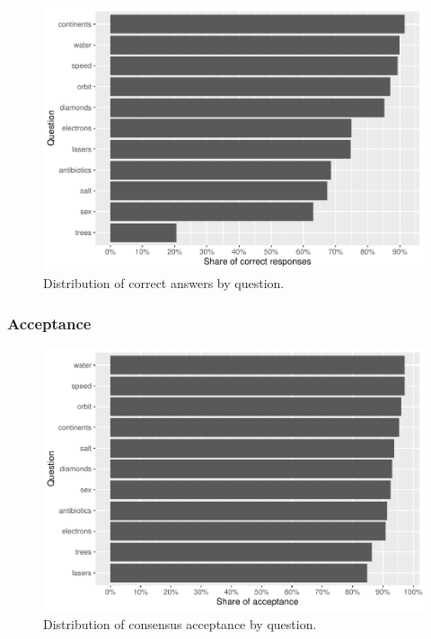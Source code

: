 \documentclass[
  doc,floatsintext]{apa6}
\begin{document}
\begin{figure}
\centering
\includegraphics{output/figures/exp1-questions-knowledge.pdf}
\caption{\label{fig:exp1-questions-knowledge}Distribution of correct answers by question.}
\end{figure}

\subsubsection{Acceptance}\label{acceptance}



\begin{figure}
\centering
\includegraphics{output/figures/exp1-questions-acceptance.pdf}
\caption{\label{fig:exp1-questions-acceptance}Distribution of consensus acceptance by question.}
\end{figure}
\end{document}
